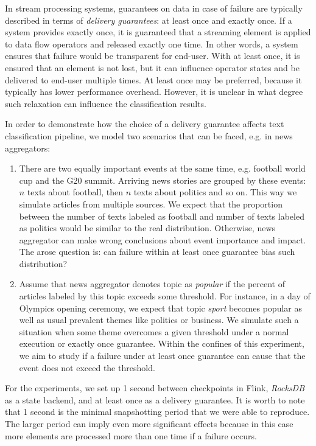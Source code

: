 In stream processing systems, guarantees on data in case of failure are typically described in terms of {\em delivery guarantees}: at least once and exactly once. If a system provides exactly once, it is guaranteed that a streaming element is applied to data flow operators and released exactly one time. In other words, a system ensures that failure would be transparent for end-user. With at least once, it is ensured that an element is not lost, but it can influence operator states and be delivered to end-user multiple times. At least once may be preferred, because it typically has lower performance overhead. However, it is unclear in what degree such relaxation can influence the classification results. 

In order to demonstrate how the choice of a delivery guarantee affects text classification pipeline, we model two scenarios that can be faced, e.g. in news aggregators:
\begin{enumerate}
    \item There are two equally important events at the same time, e.g. football world cup and the G20 summit. Arriving news stories are grouped by these events: $n$ texts about football, then $n$ texts about politics and so on. This way we simulate articles from multiple sources. We expect that the proportion between the number of texts labeled as football and number of texts labeled as politics would be similar to the real distribution. Otherwise, news aggregator can make wrong conclusions about event importance and impact. The arose question is: can failure within at least once guarantee bias such distribution?
    \item Assume that news aggregator denotes topic as {\em popular} if the percent of articles labeled by this topic exceeds some threshold. For instance, in a day of Olympics opening ceremony, we expect that topic {\em sport} becomes popular as well as usual prevalent themes like politics or business. We simulate such a situation when some theme overcomes a given threshold under a normal execution or exactly once guarantee. Within the confines of this experiment, we aim to study if a failure under at least once guarantee can cause that the event does not exceed the threshold.    
\end{enumerate}


For the experiments, we set up 1 second between checkpoints in Flink, {\em RocksDB} as a state backend, and at least once as a delivery guarantee. It is worth to note that 1 second is the minimal snapshotting period that we were able to reproduce. The larger period can imply even more significant effects because in this case more elements are processed more than one time if a failure occurs.

